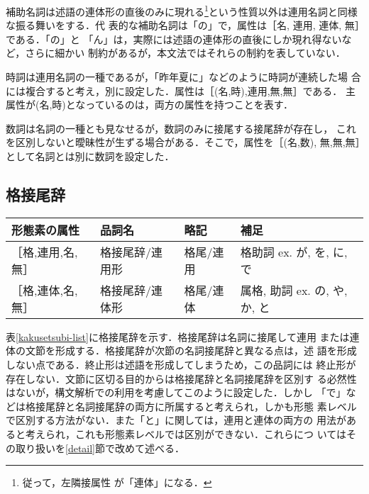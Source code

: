 補助名詞は述語の連体形の直後のみに現れる\footnote{従って，左隣接属性
が「連体」になる．}という性質以外は連用名詞と同様な振る舞いをする．代
表的な補助名詞は「の」で，属性は［名, 連用, 連体, 無］である．「の」と
「ん」は，実際には述語の連体形の直後にしか現れ得ないなど，さらに細かい
制約があるが，本文法ではそれらの制約を表していない．

時詞は連用名詞の一種であるが，「昨年夏に」などのように時詞が連続した場
合には複合すると考え，別に設定した．属性は［(名,時),連用,無,無］である．
主属性が(名,時)となっているのは，両方の属性を持つことを表す．

数詞は名詞の一種とも見なせるが，数詞のみに接尾する接尾辞が存在し，
これを区別しないと曖昧性が生ずる場合がある．そこで，属性を［(名,数),
無,無,無］として名詞とは別に数詞を設定した．


\subsection{格接尾辞}
\begin{table*}
\begin{center}
\begin{tabular}{|l|l|l|l|}
\hline
形態素の属性 & 品詞名 & 略記 & 補足 \\
\hline
［格,連用,名,無］ & 格接尾辞/連用形 & 格尾/連用 & 格助詞 ex. が, を,  に,  で \\
［格,連体,名,無］ & 格接尾辞/連体形 & 格尾/連体 & 属格, 助詞 ex. の, や, か, と \\
\hline
\end{tabular}
\end{center}
\caption{格接尾辞}
\label{kakusetsubi-list}
\end{table*}

表\ref{kakusetsubi-list}に格接尾辞を示す．格接尾辞は名詞に接尾して連用
または連体の文節を形成する．格接尾辞が次節の名詞接尾辞と異なる点は，述
語を形成しない点である．終止形は述語を形成してしまうため，この品詞には
終止形が存在しない．文節に区切る目的からは格接尾辞と名詞接尾辞を区別す
る必然性はないが，構文解析での利用を考慮してこのように設定した．しかし
「で」などは格接尾辞と名詞接尾辞の両方に所属すると考えられ，しかも形態
素レベルで区別する方法がない．また「と」に関しては，連用と連体の両方の
用法があると考えられ，これも形態素レベルでは区別ができない．これらにつ
いてはその取り扱いを\ref{detail}節で改めて述べる．

